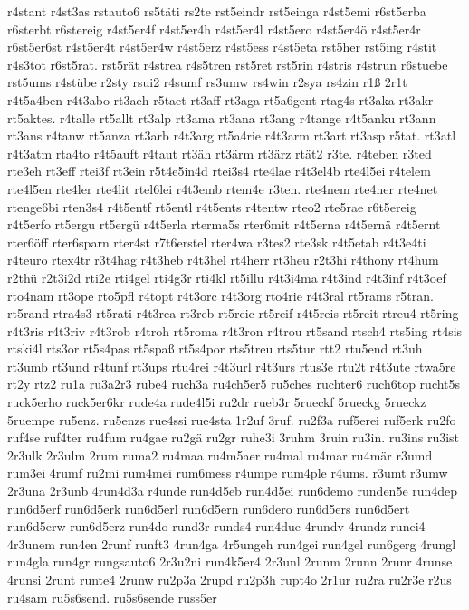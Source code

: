 {r4stant
r4st3as
rstauto6
rs5täti
rs2te
rst5eindr
rst5einga
r4st5emi
r6st5erba
r6sterbt
r6stereig
r4st5er4f
r4st5er4h
r4st5er4l
r4st5ero
r4st5er4ö
r4st5er4r
r6st5er6st
r4st5er4t
r4st5er4w
r4st5erz
r4st5ess
r4st5eta
rst5her
rst5ing
r4stit
r4s3tot
r6st5rat.
rst5rät
r4strea
r4s5tren
rst5ret
rst5rin
r4stris
r4strun
r6stuebe
rst5ums
r4stübe
r2sty
rsui2
r4sumf
rs3umw
rs4win
r2sya
rs4zin
r1ß
2r1t
r4t5a4ben
r4t3abo
rt3aeh
r5taet
rt3aff
rt3aga
rt5a6gent
rtag4s
rt3aka
rt3akr
rt5aktes.
r4talle
rt5allt
rt3alp
rt3ama
rt3ana
rt3ang
r4tange
r4t5anku
rt3ann
rt3ans
r4tanw
rt5anza
rt3arb
r4t3arg
rt5a4rie
r4t3arm
rt3art
rt3asp
r5tat.
rt3atl
r4t3atm
rta4to
r4t5auft
r4taut
rt3äh
rt3ärm
rt3ärz
rtät2
r3te.
r4teben
r3ted
rte3eh
rt3eff
rtei3f
rt3ein
r5t4e5in4d
rtei3s4
rte4lae
r4t3el4b
rte4l5ei
r4telem
rte4l5en
rte4ler
rte4lit
rtel6lei
r4t3emb
rtem4e
r3ten.
rte4nem
rte4ner
rte4net
rtenge6bi
rten3s4
r4t5entf
rt5entl
r4t5ents
r4tentw
rteo2
rte5rae
r6t5ereig
r4t5erfo
rt5ergu
rt5ergü
r4t5erla
rterma5s
rter6mit
r4t5erna
r4t5ernä
r4t5ernt
rter6öff
rter6sparn
rter4st
r7t6erstel
rter4wa
r3tes2
rte3sk
r4t5etab
r4t3e4ti
r4teuro
rtex4tr
r3t4hag
r4t3heb
r4t3hel
rt4herr
rt3heu
r2t3hi
r4thony
rt4hum
r2thü
r2t3i2d
rti2e
rti4gel
rti4g3r
rti4kl
rt5illu
r4t3i4ma
r4t3ind
r4t3inf
r4t3oef
rto4nam
rt3ope
rto5pfl
r4topt
r4t3orc
r4t3org
rto4rie
r4t3ral
rt5rams
r5tran.
rt5rand
rtra4s3
rt5rati
r4t3rea
rt3reb
rt5reic
rt5reif
r4t5reis
rt5reit
rtreu4
rt5ring
r4t3ris
r4t3riv
r4t3rob
r4troh
rt5roma
r4t3ron
r4trou
rt5sand
rtsch4
rts5ing
rt4sis
rtski4l
rts3or
rt5s4pas
rt5spaß
rt5s4por
rts5treu
rts5tur
rtt2
rtu5end
rt3uh
rt3umb
rt3und
r4tunf
rt3ups
rtu4rei
r4t3url
r4t3urs
rtus3e
rtu2t
r4t3ute
rtwa5re
rt2y
rtz2
ru1a
ru3a2r3
rube4
ruch3a
ru4ch5er5
ru5ches
ruchter6
ruch6top
rucht5s
ruck5erho
ruck5er6kr
rude4a
rude4l5i
ru2dr
rueb3r
5rueckf
5rueckg
5rueckz
5ruempe
ru5enz.
ru5enzs
rue4ssi
rue4sta
1r2uf
3ruf.
ru2f3a
ruf5erei
ruf5erk
ru2fo
ruf4se
ruf4ter
ru4fum
ru4gae
ru2gä
ru2gr
ruhe3i
3ruhm
3ruin
ru3in.
ru3ins
ru3ist
2r3ulk
2r3ulm
2rum
ruma2
ru4maa
ru4m5aer
ru4mal
ru4mar
ru4mär
r3umd
rum3ei
4rumf
ru2mi
rum4mei
rum6mess
r4umpe
rum4ple
r4ums.
r3umt
r3umw
2r3una
2r3unb
4run4d3a
r4unde
run4d5eb
run4d5ei
run6demo
runden5e
run4dep
run6d5erf
run6d5erk
run6d5erl
run6d5ern
run6dero
run6d5ers
run6d5ert
run6d5erw
run6d5erz
run4do
rund3r
runds4
run4due
4rundv
4rundz
runei4
4r3unem
run4en
2runf
runft3
4run4ga
4r5ungeh
run4gei
run4gel
run6gerg
4rungl
run4gla
run4gr
rungsauto6
2r3u2ni
run4k5er4
2r3unl
2runm
2runn
2runr
4runse
4runsi
2runt
runte4
2runw
ru2p3a
2rupd
ru2p3h
rupt4o
2r1ur
ru2ra
ru2r3e
r2us
ru4sam
ru5s6send.
ru5s6sende
russ5er
}
